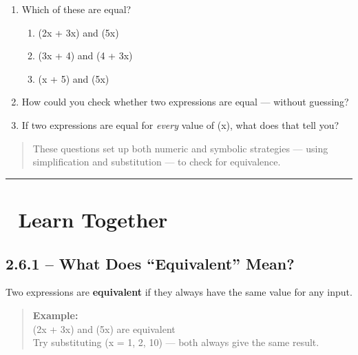 \documentclass[
  letterpaper,
  DIV=11,
  numbers=noendperiod]{scrreprt}
\providecommand{\tightlist}{%
  \setlength{\itemsep}{0pt}\setlength{\parskip}{0pt}}
\begin{document}
\begin{enumerate}
\def\labelenumi{\arabic{enumi}.}
\item
  Which of these are equal?

  \begin{enumerate}
  \def\labelenumii{\alph{enumii}.}
  \tightlist
  \item
    (2x + 3x) and (5x)\\
  \item
    (3x + 4) and (4 + 3x)\\
  \item
    (x + 5) and (5x)
  \end{enumerate}
\item
  How could you check whether two expressions are equal --- without
  guessing?
\item
  If two expressions are equal for \emph{every} value of (x), what does
  that tell you?
\end{enumerate}

\begin{quote}
These questions set up both numeric and symbolic strategies --- using
simplification and substitution --- to check for equivalence.
\end{quote}

\begin{center}\rule{0.5\linewidth}{0.5pt}\end{center}

\section*{🧠 Learn Together}\label{learn-together-12}


\subsection*{2.6.1 -- What Does ``Equivalent''
Mean?}\label{what-does-equivalent-mean}

Two expressions are \textbf{equivalent} if they always have the same
value for any input.

\begin{quote}
\textbf{Example:}\\
(2x + 3x) and (5x) are equivalent\\
Try substituting (x = 1, 2, 10) --- both always give the same result.
\end{quote}
\end{document}
